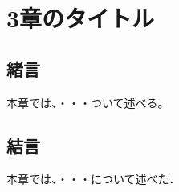 \chapter{3章のタイトル}
\label{chap:third}


\section{緒言}
本章では、・・・ついて述べる。



\section{結言}
本章では、・・・について述べた．
